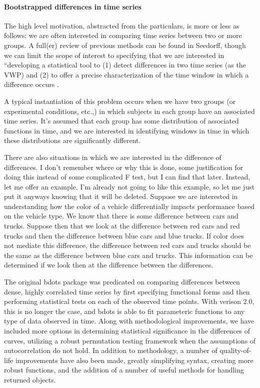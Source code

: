 \documentclass{article}
\begin{document}
\paragraph{Bootstrapped differences in time series}

The high level motivation, abstracted from the particulars, is more or less as follows: we are often interested in comparing time series between two or more groups. A full(er) review of previous methods can be found in Seedorff,  though we can limit the scope of interest to specifying that we are interested in ``developing a statistical tool to (1) detect differences in two time series (as the VWP) and (2) to offer a precise characterization of the time window in which a difference occurs \cite{seedorff2018bdots}. 

A typical instantiation of this problem occurs when we have two groups (or experimental conditions, etc.,) in which subjects in each group have an associated time series. It's assumed that each group has some distribution of associated functions in time, and we are interested in identifying windows in time in which these distributions are significantly different.

There are also situations in which we are interested in the difference of differences. I don't remember where or why this is done, some justification for doing this instead of some complicated F test, but I can find that later. Instead, let me offer an example. I'm already not going to like this example, so let me just put it anyways knowing that it will be deleted. Suppose we are interested in understanding how the color of a vehicle differentially impacts performance based on the vehicle type. We know that there is some difference between cars and trucks. Suppose then that we look at the difference between red cars and red trucks and then the difference between blue cars and blue trucks. If color does not mediate this difference, the difference between red cars and trucks should be the same as the difference between blue cars and trucks. This information can be determined if we look then at the difference between the differences. 

The original bdots package was predicated on comparing differences between dense, highly correlated time series by first specifying functional forms and then performing statistical tests on each of the observed time points. With verison 2.0, this is no longer the case, and bdots is able to fit parameteric functions to any type of data observed in time. Along with methodological improvements, we have included more options in determining statistical significance in the differences of curves, utilizing a robust permutation testing framework when the assumptions of autocorrelation do not hold. In addition to methodology, a number of quality-of-life improvements have also been made, greatly simplifying syntax, creating more robust functions, and the addition of a number of useful methods for handling returned objects.
\end{document}
